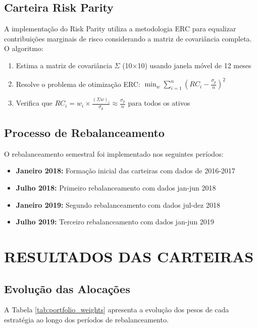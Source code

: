 \subsection{Carteira Risk Parity}

A implementação do Risk Parity utiliza a metodologia ERC para equalizar contribuições marginais de risco considerando a matriz de covariância completa. O algoritmo:

\begin{enumerate}
    \item Estima a matriz de covariância $\Sigma$ (10×10) usando janela móvel de 12 meses
    \item Resolve o problema de otimização ERC: $\min_{w} \sum_{i=1}^{n} \left( RC_i - \frac{\sigma_p}{n} \right)^2$
    \item Verifica que $RC_i = w_i \times \frac{(\Sigma w)_i}{\sigma_p} \approx \frac{\sigma_p}{n}$ para todos os ativos
\end{enumerate}

\subsection{Processo de Rebalanceamento}

O rebalanceamento semestral foi implementado nos seguintes períodos:
\begin{itemize}
    \item \textbf{Janeiro 2018:} Formação inicial das carteiras com dados de 2016-2017
    \item \textbf{Julho 2018:} Primeiro rebalanceamento com dados jan-jun 2018
    \item \textbf{Janeiro 2019:} Segundo rebalanceamento com dados jul-dez 2018
    \item \textbf{Julho 2019:} Terceiro rebalanceamento com dados jan-jun 2019
\end{itemize}

\section{RESULTADOS DAS CARTEIRAS}

\subsection{Evolução das Alocações}

A Tabela \ref{tab:portfolio_weights} apresenta a evolução dos pesos de cada estratégia ao longo dos períodos de rebalanceamento.

